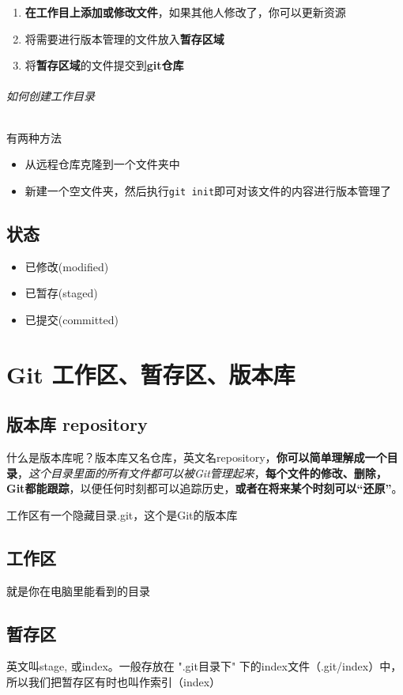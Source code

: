 \documentclass[UTF8,a4paper,12pt]{ctexbook}
\begin{document}
	  \begin{enumerate}[itemindent = 2em]
	  	\item \textbf{在工作目上添加或修改文件}，如果其他人修改了，你可以更新资源
	  	\item 将需要进行版本管理的文件放入\textbf{暂存区域}                    
	  	\item 将\textbf{暂存区域}的文件提交到\textbf{git仓库} 
	  \end{enumerate}
	  
	  \subparagraph{如何创建工作目录}
		  有两种方法
		  
		  \begin{itemize}[itemindent = 2em]
		  	\item 从远程仓库克隆到一个文件夹中
		  	\item 新建一个空文件夹，然后执行\verb|git init|即可对该文件的内容进行版本管理了
		  \end{itemize}
	  \section{状态}
		  \begin{itemize}[itemindent = 2em]
		  	\item 已修改(modified)
		  	\item 已暂存(staged)
		  	\item 已提交(committed)
		  \end{itemize}
		  
  \chapter{Git 工作区、暂存区、版本库}
	  \section{版本库 repository}
		  什么是版本库呢？版本库又名仓库，英文名repository，\textbf{你可以简单理解成一个目录}，\textit{这个目录里面的所有文件都可以被Git管理起来}，\textbf{每个文件的修改、删除，Git都能跟踪}，以便任何时刻都可以追踪历史，\textbf{或者在将来某个时刻可以“还原”}。
		  
		  工作区有一个隐藏目录.git，这个是Git的版本库
	  \section{工作区}
		  就是你在电脑里能看到的目录
		  
	  \section{暂存区}
		  英文叫stage, 或index。一般存放在 ".git目录下" 下的index文件（.git/index）中，所以我们把暂存区有时也叫作索引（index）
		  
\end{document}
